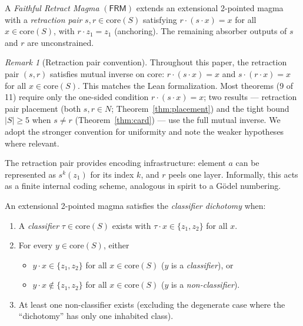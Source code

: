 \documentclass[sigconf,screen]{acmart}
\newcommand{\dotop}{\cdot}
\newcommand{\FRM}{\textsf{FRM}}
\newcommand{\core}{\mathrm{core}}
\theoremstyle{remark}
\newtheorem{remark}{Remark}
\begin{document}
\begin{definition}
\label{def:frm}
A \emph{Faithful Retract Magma} $(\FRM)$ extends an extensional 2-pointed magma with a \emph{retraction pair} $s, r \in \core(S)$ satisfying $r \dotop (s \dotop x) = x$ for all $x \in \core(S)$, with $r \dotop z_1 = z_1$ (anchoring). The remaining absorber outputs of $s$ and $r$ are unconstrained.
\end{definition}

\begin{remark}[Retraction pair convention]
\label{rem:mutual}
Throughout this paper, the retraction pair $(s, r)$ satisfies mutual inverse on core: $r \dotop (s \dotop x) = x$ and $s \dotop (r \dotop x) = x$ for all $x \in \core(S)$. This matches the Lean formalization. Most theorems (9 of 11) require only the one-sided condition $r \dotop (s \dotop x) = x$; two results --- retraction pair placement (both $s, r \in N$; Theorem~\ref{thm:placement}) and the tight bound $|S| \geq 5$ when $s \neq r$ (Theorem~\ref{thm:card}) --- use the full mutual inverse. We adopt the stronger convention for uniformity and note the weaker hypotheses where relevant.
\end{remark}

The retraction pair provides encoding infrastructure: element $a$ can be represented as $s^k(z_1)$ for its index $k$, and $r$ peels one layer. Informally, this acts as a finite internal coding scheme, analogous in spirit to a G\"odel numbering.

\begin{definition}
\label{def:cd}
An extensional 2-pointed magma satisfies the \emph{classifier dichotomy} when:
\begin{enumerate}
  \item A \emph{classifier} $\tau \in \core(S)$ exists with $\tau \dotop x \in \{z_1, z_2\}$ for all $x$.
  \item For every $y \in \core(S)$, either
    \begin{itemize}
      \item $y \dotop x \in \{z_1, z_2\}$ for all $x \in \core(S)$ \quad ($y$ is a \emph{classifier}), or
      \item $y \dotop x \notin \{z_1, z_2\}$ for all $x \in \core(S)$ \quad ($y$ is a \emph{non-classifier}).
    \end{itemize}
  \item At least one non-classifier exists (excluding the degenerate case where the ``dichotomy'' has only one inhabited class).
\end{enumerate}
\end{definition}
\end{document}
